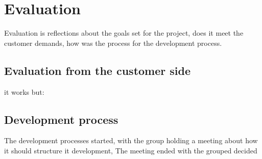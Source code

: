 \section{Evaluation}
Evaluation is reflections about the goals set for the project, does it meet
the customer demands, how was the process for the development process.

\subsection{Evaluation from the customer side}

it works but:


\subsection{Development process}
The development processes started, with the group holding a meeting about
how it should structure it development, The meeting ended with the grouped decided




